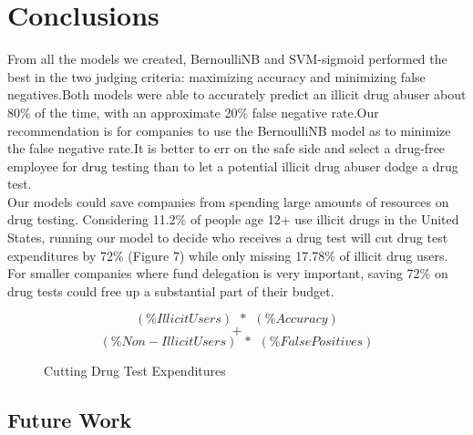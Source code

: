 \section{Conclusions}

From all the models we created, BernoulliNB and SVM-sigmoid performed the best in the two judging criteria: maximizing accuracy and minimizing false negatives.\hspace{1pt}Both models were able to accurately predict an illicit drug abuser about 80\% of the time, with an approximate 20\% false negative rate.\hspace{1pt}Our recommendation is for companies to use the BernoulliNB model as to minimize the false negative rate.\hspace{1pt}It is better to err on the safe side and select a  drug-free employee for drug testing than to let a potential illicit drug abuser dodge a drug test.\\

Our models could save companies from spending large amounts of resources on drug testing. Considering 11.2\% of people age 12+ use illicit drugs in the United States\cite{cdc-drug}, running our model to decide who receives a drug test will cut drug test expenditures by 72\% (Figure 7) while only missing 17.78\% of  illicit drug users. For smaller companies where fund delegation is very important, saving 72\% on drug tests could free up a substantial part of their budget. 

\vspace{-10pt}

\begin{figure}[h!]
    \[ (\%Illicit Users)\hspace{5pt}*\hspace{5pt}(\%Accuracy) \]
    \vspace{-20pt}
    \[ + \]
    \vspace{-15pt}
    \[ (\%Non-Illicit Users)\hspace{5pt}*\hspace{5pt}(\%False Positives) \]
    \vspace{1pt}
    \caption{Cutting Drug Test Expenditures}
\end{figure}

\subsection{Future Work}

